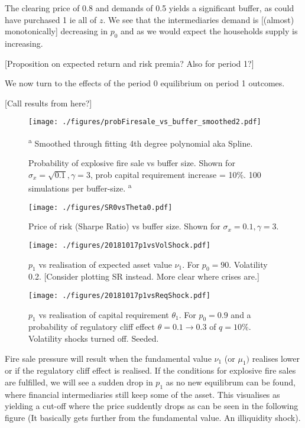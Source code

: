 \documentclass[11pt]{article}
\begin{document}
The clearing price of 0.8 and demands of 0.5 yields a significant buffer, as could have purchased 1 ie all of $z$.  We see that the intermediaries demand is [(almost) monotonically] decreasing in $p_0$ and as we would expect the households supply is increasing.

[Proposition on expected return and risk premia? Also for period 1?]

We now turn to the effects of the period 0 equilibrium on period 1 outcomes.

[Call results from here?]

\begin{figure}[h]
\centering
\texttt{[image: ./figures/probFiresale\_vs\_buffer\_smoothed2.pdf]}
\caption{Probability of explosive fire sale vs buffer size. Shown for $\sigma_x = \sqrt{0.1}, \gamma = 3$, prob capital requirement increase = 10\%. 100 simulations per buffer-size.\textsuperscript{\color{blue} a}}
{\small\textsuperscript{{\color{blue} a}} Smoothed through fitting 4th degree polynomial aka Spline.}
\label{f_probFSvsBuffer}
\end{figure}

\begin{figure}[h]
\centering
\texttt{[image: ./figures/SR0vsTheta0.pdf]}
\caption{Price of risk (Sharpe Ratio) vs buffer size. Shown for $\sigma_x = 0.1, \gamma = 3$. }
\label{f_probFSvsBuffer}
\end{figure}

\begin{figure}[h] 
\centering
\texttt{[image: ./figures/20181017p1vsVolShock.pdf]}
\caption{$p_1$ vs realisation of expected asset value  $\nu_1$. For $p_0 = 90$. Volatility 0.2. [Consider plotting SR instead. More clear where crises are.]}
\label{f_price1vsvolshock}
\end{figure}

\begin{figure}[h]
\centering
\texttt{[image: ./figures/20181017p1vsReqShock.pdf]}
\caption{$p_1$ vs realisation of capital requirement $\theta_1$. For $p_0 = 0.9$ and a probability of regulatory cliff effect $\theta = 0.1  \rightarrow 0.3$ of $q = 10\% $. Volatility shocks turned off. Seeded.}
\label{f_price1vsRegShock}
\end{figure}

Fire sale pressure will result when the fundamental value $\nu_1$ (or $\mu_1)$ realises lower or if the regulatory cliff effect is realised. If the conditions for explosive fire sales are fulfilled, we will see a sudden drop in $p_1$ as no new equilibrum can be found, where financial intermediaries still keep some of the asset. This visualises as yielding a cut-off where the price suddently drops as can be seen in the following figure (It basically gets further from the fundamental value. An illiquidity shock).
\end{document}
